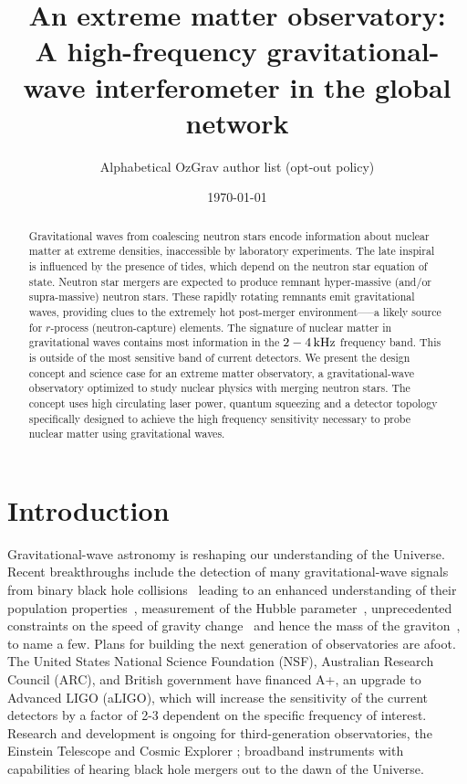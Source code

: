 \documentclass[prx,superscriptaddress,twocolumn,nopreprintnumbers,floatfix,nofootinbib]{revtex4}
\begin{document}
\title{An extreme matter observatory:\\A high-frequency gravitational-wave interferometer in the global network}

\author{Alphabetical OzGrav author list (opt-out policy)}
\affiliation{}
\affiliation{}

\date{\today}

\begin{abstract}
Gravitational waves from coalescing neutron stars encode information about nuclear matter at extreme densities, inaccessible by laboratory experiments. The late inspiral is influenced by the presence of tides, which depend on the neutron star equation of state.
Neutron star mergers are expected to produce remnant hyper-massive (and/or supra-massive) neutron stars. These rapidly rotating remnants emit gravitational waves, providing clues to the extremely hot post-merger environment—--a likely source for $r$-process (neutron-capture) elements.
The signature of nuclear matter in gravitational waves contains most information in the $\unit[2-4]{kHz}$ frequency band. This is outside of the most sensitive band of current detectors.
We present the design concept and science case for an extreme matter observatory, a gravitational-wave observatory optimized to study nuclear physics with merging neutron stars.
The concept uses high circulating laser power, quantum squeezing and a detector topology specifically designed to achieve the high frequency sensitivity necessary to probe nuclear matter using gravitational waves. 
\end{abstract}

\maketitle

\section{Introduction}
Gravitational-wave astronomy is reshaping our understanding of the Universe.
Recent breakthroughs include the detection of many gravitational-wave signals from binary black hole collisions~\cite{abbott18_O2catalog} leading to an enhanced understanding of their population properties~\cite{abbott18_O2population}, measurement of the Hubble parameter~\cite{abbott17_gw170817_Hubble}, unprecedented constraints on the speed of gravity change~\cite{abbott17_gw170817_gwgrb} and hence the mass of the graviton~\cite{abbott17_gw170104,abbott19_gw170817_grtest}, to name a few.
Plans for building the next generation of observatories are afoot.  The United States National Science Foundation (NSF), Australian Research Council (ARC), and British government have financed A+, an upgrade to Advanced LIGO (aLIGO), which will increase the sensitivity of the current detectors by a factor of 2-3 dependent on the specific frequency of interest.
Research and development is ongoing for third-generation observatories, the Einstein Telescope \cite{punturo2010einstein} and Cosmic Explorer \cite{reitze2019cosmic}; broadband instruments with capabilities of hearing black hole mergers out to the dawn of the Universe.
\end{document}
